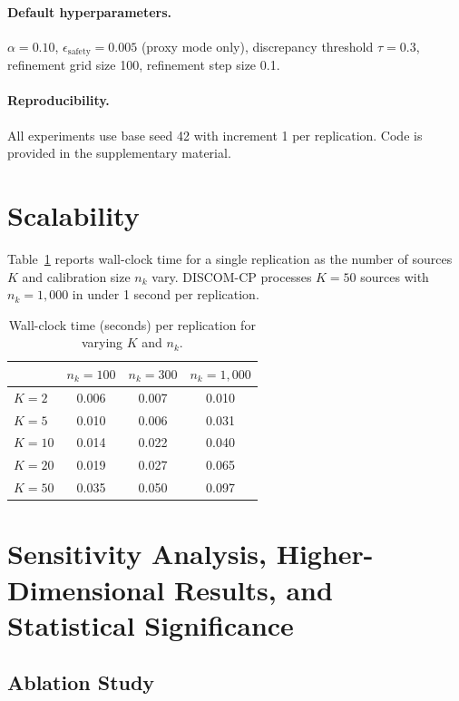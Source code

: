 \documentclass{article}
\newcommand{\DISCOM}{\textsc{DISCOM-CP}}
\begin{document}
\paragraph{Default hyperparameters.}
$\alpha = 0.10$, $\epsilon_{\text{safety}} = 0.005$ (proxy mode only), discrepancy threshold $\tau = 0.3$, refinement grid size 100, refinement step size 0.1.

\paragraph{Reproducibility.}
All experiments use base seed 42 with increment 1 per replication. Code is provided in the supplementary material.

\section{Scalability}
\label{app:scalability}

Table~\ref{tab:scalability} reports wall-clock time for a single replication as the number of sources $K$ and calibration size $n_k$ vary. \DISCOM{} processes $K = 50$ sources with $n_k = 1{,}000$ in under 1 second per replication.

\begin{table}[h]
\caption{Wall-clock time (seconds) per replication for varying $K$ and $n_k$.}
\label{tab:scalability}
\centering
\small
\begin{tabular}{lccc}
\toprule
& $n_k = 100$ & $n_k = 300$ & $n_k = 1{,}000$ \\
\midrule
$K = 2$ & 0.006 & 0.007 & 0.010 \\
$K = 5$ & 0.010 & 0.006 & 0.031 \\
$K = 10$ & 0.014 & 0.022 & 0.040 \\
$K = 20$ & 0.019 & 0.027 & 0.065 \\
$K = 50$ & 0.035 & 0.050 & 0.097 \\
\bottomrule
\end{tabular}
\end{table}

\section{Sensitivity Analysis, Higher-Dimensional Results, and Statistical Significance}
\label{app:sensitivity}

\subsection*{Ablation Study}
\end{document}
